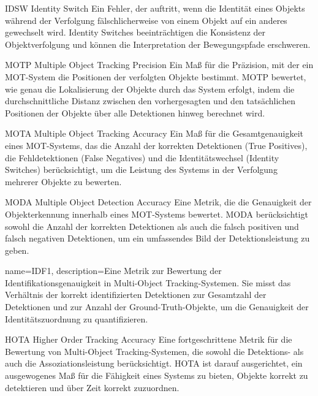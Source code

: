 \newglossaryentrywithacronym
{IDSW}
{Identity Switch}
{Ein Fehler, der auftritt, wenn die Identität eines Objekts während der Verfolgung fälschlicherweise von einem Objekt auf ein anderes gewechselt wird. Identity Switches beeinträchtigen die Konsistenz der Objektverfolgung und können die Interpretation der Bewegungspfade erschweren.}


\newglossaryentrywithacronym
{MOTP}
{Multiple Object Tracking Precision}
{Ein Maß für die Präzision, mit der ein MOT-System die Positionen der verfolgten Objekte bestimmt. MOTP bewertet, wie genau die Lokalisierung der Objekte durch das System erfolgt, indem die durchschnittliche Distanz zwischen den vorhergesagten und den tatsächlichen Positionen der Objekte über alle Detektionen hinweg berechnet wird.}

\newglossaryentrywithacronym
{MOTA}
{Multiple Object Tracking Accuracy}
{Ein Maß für die Gesamtgenauigkeit eines MOT-Systems, das die Anzahl der korrekten Detektionen (True Positives), die Fehldetektionen (False Negatives) und die Identitätswechsel (Identity Switches) berücksichtigt, um die Leistung des Systems in der Verfolgung mehrerer Objekte zu bewerten.}

\newglossaryentrywithacronym
{MODA}
{Multiple Object Detection Accuracy}
{Eine Metrik, die die Genauigkeit der Objekterkennung innerhalb eines MOT-Systems bewertet. MODA berücksichtigt sowohl die Anzahl der korrekten Detektionen als auch die falsch positiven und falsch negativen Detektionen, um ein umfassendes Bild der Detektionsleistung zu geben.}

{
name=IDF1,
description={Eine Metrik zur Bewertung der Identifikationsgenauigkeit in Multi-Object Tracking-Systemen. Sie misst das Verhältnis der korrekt identifizierten Detektionen zur Gesamtzahl der Detektionen und zur Anzahl der Ground-Truth-Objekte, um die Genauigkeit der Identitätszuordnung zu quantifizieren.}
}

\newglossaryentrywithacronym
{HOTA}
{Higher Order Tracking Accuracy}
{Eine fortgeschrittene Metrik für die Bewertung von Multi-Object Tracking-Systemen, die sowohl die Detektions- als auch die Assoziationsleistung berücksichtigt. HOTA ist darauf ausgerichtet, ein ausgewogenes Maß für die Fähigkeit eines Systems zu bieten, Objekte korrekt zu detektieren und über Zeit korrekt zuzuordnen.}

